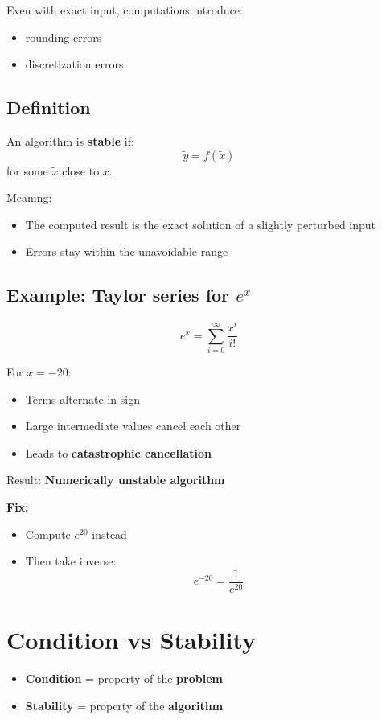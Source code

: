 \documentclass{article}
\begin{document}
Even with exact input, computations introduce:
\begin{itemize}
  \item rounding errors
  \item discretization errors
\end{itemize}

\subsection{Definition}

An algorithm is \textbf{stable} if:
\[
\tilde{y} = f(\tilde{x})
\]
for some $\tilde{x}$ close to $x$.

Meaning:
\begin{itemize}
  \item The computed result is the exact solution of a slightly perturbed input
  \item Errors stay within the unavoidable range
\end{itemize}

\subsection{Example: Taylor series for $e^x$}

\[
e^x = \sum_{i=0}^{\infty} \frac{x^i}{i!}
\]

For $x = -20$:

\begin{itemize}
  \item Terms alternate in sign
  \item Large intermediate values cancel each other
  \item Leads to \textbf{catastrophic cancellation}
\end{itemize}

Result: \textbf{Numerically unstable algorithm}

\textbf{Fix:}
\begin{itemize}
  \item Compute $e^{20}$ instead
  \item Then take inverse:
  \[
  e^{-20} = \frac{1}{e^{20}}
  \]
\end{itemize}

\section{Condition vs Stability}

\begin{itemize}
  \item \textbf{Condition} = property of the \textbf{problem}
  \item \textbf{Stability} = property of the \textbf{algorithm}
\end{itemize}
\end{document}
